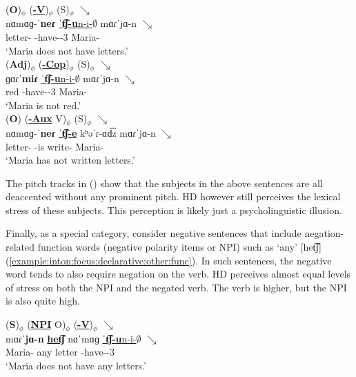 \begin{exe}
	\ex \label{example:inton:focus:declarative:other:ovs} \begin{xlist}
		\ex \glll (\textbf{O})$_\phi$ (\textbf{\underline{\neggloss-V}})$_\phi$  ({S})$_\phi$  $\searrow$ \\
		nɑmɑɡ-ˈ\textbf{neɾ} \underline{ˈ\textbf{t͡ʃ-u}n-i-$\emptyset$} mɑɾˈ{jɑ-n} $\searrow$ \\
		letter-{\pl} {\neggloss}-have-{\thgloss}-3{\sg} Maria-{} \\
		\trans `Maria does not have letters.'
		\\ 
		\ex \glll (\textbf{Adj})$_\phi$ (\textbf{\underline{{\neggloss}-Cop}})$_\phi$  ({S})$_\phi$  $\searrow$ \\
		ɡɑɾˈ\textbf{miɾ} \underline{ˈ\textbf{t͡ʃ-u}n-i-$\emptyset$} mɑɾˈ{jɑ-n} $\searrow$ \\
		red  {\neggloss}-have-{\thgloss}-3{\sg} Maria-{} \\
		\trans `Maria is not red.'
		\\ 
		\ex \glll   ({\textbf{O}}) (\underline{\textbf{{\neggloss}-Aux}} V)$_\phi$ ({S})$_\phi$  $\searrow$ \\
		{nɑ{mɑɡ}-ˈ\textbf{neɾ}} \underline{ˈ\textbf{t͡ʃ-e}} kʰəˈɾ-ɑd͡z mɑɾˈ{jɑ-n}    $\searrow$ \\
		letter-{\pl} {\neggloss}-is write-{\rptcp}  Maria-{} \\
		\trans `Maria has not written letters.' 
		\\ 
	\end{xlist}
\end{exe}

The pitch tracks in () show that the subjects in the above sentences are all deaccented without any  prominent pitch. HD however still perceives the lexical stress of these subjects. This perception is likely just a psycholinguistic illusion. 

Finally, as a special category, consider negative sentences that include negation-related function words (negative polarity items or NPI) such as `any' [het͡ʃ] (\ref{example:inton:focus:declarative:other:func}). In such sentences, the negative word tends to also require negation on the verb. HD perceives almost equal levels of stress on both the NPI and the negated verb. The verb is higher, but the NPI is also quite high. 


\begin{exe}
	\ex \glll   (\textbf{S})$_\phi$ (\underline{\textbf{NPI}} {O})$_\phi$ (\underline{\textbf{{\neggloss}-V}})$_\phi$ $\searrow$ \\
	mɑɾˈ\textbf{jɑ-n}  \underline{\textbf{het͡ʃ}}  {nɑˈ{mɑɡ}} \underline{ˈ\textbf{t͡ʃ-u}n-i-$\emptyset$}  $\searrow$ \\
	Maria-{} any letter {\neggloss}-have-{\thgloss}-3{\sg}   \\
	\trans `Maria does not have any letters.' \label{example:inton:focus:declarative:other:func}
	\\ 
\end{exe}

